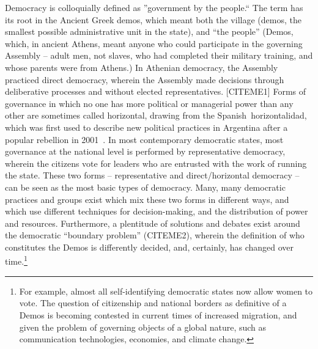 Democracy is colloquially defined as ''government by the people.`` The term has
its root in the Ancient Greek demos, which meant both the village (demos, the
smallest possible administrative unit in the state), and ``the people'' (Demos,
which, in ancient Athens, meant anyone who could participate in the governing
Assembly -- adult men, not slaves, who had completed their military training,
and whose parents were from Athens.) In Athenian democracy, the Assembly
practiced direct democracy, wherein the Assembly made decisions through
deliberative processes and without elected representatives. [CITEME1] Forms of
governance in which no one has more political or managerial power than any other
are sometimes called horizontal, drawing from the Spanish horizontalidad, which
was first used to describe new political practices in Argentina after a popular
rebellion in 2001~\cite{sitrin2012everyday}. In most contemporary democratic states, most governance at the national level is performed by representative democracy,
wherein the citizens vote for leaders who are entrusted with the work of running
the state. These two forms – representative and direct/horizontal democracy --
can be seen as the most basic types of democracy. Many, many democratic
practices and groups exist which mix these two forms in different ways, and
which use different techniques for decision-making, and the distribution of
power and resources. Furthermore, a plentitude of solutions and debates exist
around the democratic ``boundary problem'' (CITEME2), wherein the definition of
who constitutes the Demos is differently decided, and, certainly, has changed
over time.\footnote{For example, almost all self-identifying democratic states
now allow women to vote. The question of citizenship and national borders as
definitive of a Demos is becoming contested in current times of increased
migration, and given the problem of governing objects of a global nature, such
as communication technologies, economies, and climate change.}

